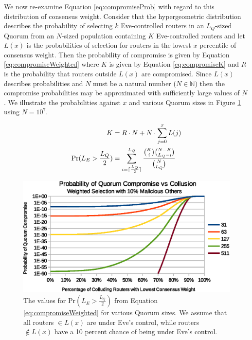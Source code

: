 \documentclass[conference]{IEEEtran}
\DeclarePairedDelimiter{\ceil}{\lceil}{\rceil}
\begin{document}
We now re-examine Equation \ref{eq:compromiseProb} with regard to this distribution of consensus weight. Consider that the hypergeometric distribution describes the probability of selecting $ k $ Eve-controlled routers in an $ L_{Q} $-sized Quorum from an $ N $-sized population containing $ K $ Eve-controlled routers and let $ L(x) $ is the probabilities of selection for routers in the lowest $ x $ percentile of consensus weight. Then the probability of compromise is given by Equation \ref{eq:compromiseWeighted} where $ K $ is given by Equation \ref{eq:compromiseK} and $ R $ is the probability that routers outside $ L(x) $ are compromised. Since $ L(x) $ describes probabilities and $ N $ must be a natural number ($ N \in \mathbb{N} $) then the compromise probabilities may be approximated with sufficiently large values of $ N $. We illustrate the probabilities against $ x $ and various Quorum sizes in Figure \ref{fig:quorumWeightedMajority} using $ N = 10^{7} $.

\begin{align}
	K &= R \cdot N + N \cdot \displaystyle\sum_{j=0}^{x} L(j)
	\label{eq:compromiseK}
	\\
	\mathrm{Pr}(L_{E} > \frac{L_{Q}}{2}) &= \displaystyle\sum_{i=\ceil{\frac{L_{Q}}{2}}}^{L_{Q}} \frac{\binom{K}{i}\binom{N - K}{L_{Q} - i}}{\binom{N}{L_{Q}}}
	\label{eq:compromiseWeighted}
\end{align}

\begin{figure}[htbp]
	\centering
	\includegraphics[width=\linewidth]{../assets/analysis/QuorumSelectionWeighted10.eps}
	\caption{The values for $ \mathrm{Pr}(L_{E} > \frac{L_{Q}}{2}) $ from Equation \ref{eq:compromiseWeighted} for various Quorum sizes. We assume that all routers $ \in L(x) $ are under Eve's control, while routers $ \notin L(x) $ have a 10 percent chance of being under Eve's control.}
	\label{fig:quorumWeightedMajority}
\end{figure}
\end{document}
